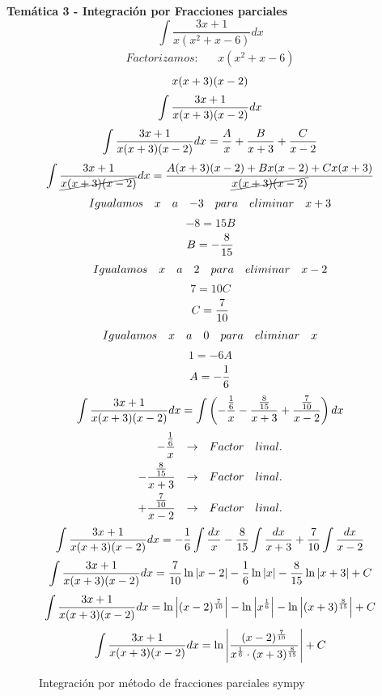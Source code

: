 






\textbf{Temática 3 - Integración por Fracciones parciales}
\[\int\frac{3x+1}{x(x^2+x-6)}dx\]
\[
    \begin{aligned}
        Factorizamos: && x(x^2+x-6)
    \end{aligned}
\]
\[\drwdenominator{0}\]
\[\fracexpretion{0}\]
\[\fracexpretion{0}=\frac{A}{\fexpression}+\frac{B}{\sexpression}+\frac{C}{\texpression}\]
\[\fracexpretion{1}=\frac{A(\sexpression)(\texpression)+B\fexpression(\texpression)+C\fexpression(\sexpression)}{\drwdenominator{1}}\]
\[
    \begin{aligned}
        Igualamos && x && a && -3 && para && eliminar && x+3
    \end{aligned}
\]
\[-8=15B\]
\[B=\fracb{1}\]
\[
    \begin{aligned}
        Igualamos && x && a && 2 && para && eliminar && x-2
    \end{aligned}
\]
\[7=10C\]
\[C=\frac{7}{10}\]
\[
    \begin{aligned}
        Igualamos && x && a && 0 && para && eliminar && x
    \end{aligned}
\]
\[1=-6A\]
\[A=\fraca{1}\]
\[\fracexpretion{0}=\int\left(\drawffraction\drawsfraction\drawtfraction\right)dx\]
\[
    \begin{aligned}
       \drawffraction && \rightarrow && Factor && linal. \\
       \drawsfraction && \rightarrow && Factor && linal. \\
       \drawtfraction && \rightarrow && Factor && linal.
    \end{aligned}
\]
\[\fracexpretion{0}=\fraca{1}\int\frac{dx}{\fexpression}\fracb{1}\int\frac{dx}{\sexpression}+\fracc\int\frac{dx}{\texpression}\]
\[\fracexpretion{0}=\fracc\ln\left|\texpression\right|\fraca{1}\ln\left|\fexpression\right|\fracb{1}\ln\left|\sexpression\right|+C\]
\[\fracexpretion{0}=\ln\left|\drawtexpression\right|-\ln\left|\drawfexpression\right|-\ln\left|\drawsexpression\right|+C\]
\[\fracexpretion{0}=\ln\left|\frac{\drawtexpression}{\drawfexpression\cdot\drawsexpression}\right|+C\]

\begin{figure}[h]
    \begin{center}
        \caption{Integración por método de fracciones parciales sympy}
    \end{center}
\end{figure}